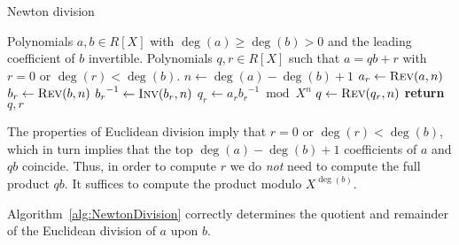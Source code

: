 \begin{algorithm}[H]
\caption{Newton division}
\label{alg:NewtonDivision}
\begin{algorithmic}
\vspace{1mm}
\Require Polynomials $a, b \in R[X]$ with $\deg(a) \geq \deg(b) > 0$ 
         and the leading coefficient of $b$ invertible.
\Ensure  Polynomials $q, r \in R[X]$ such that $a = qb + r$ with $r = 0$ 
         or $\deg(r) < \deg(b)$.
\State  $n \gets \deg(a) - \deg(b) + 1$
\State  $a_r \gets \Call{Rev}{a,n}$
\State  $b_r \gets \Call{Rev}{b,n}$
\State  ${b_r}^{-1} \gets \Call{Inv}{b_r,n}$
\State  $q_r \gets a_r {b_r}^{-1} \bmod X^n$
\State  $q \gets \Call{Rev}{q_r, n}$
\State \textbf{return} $q, r$
\EndProcedure
\end{algorithmic}
\end{algorithm}

\begin{rem}
The properties of Euclidean division imply that $r = 0$ or 
$\deg(r) < \deg(b)$, which in turn implies that the top 
$\deg(a) - \deg(b) + 1$ coefficients of $a$ and $q b$ 
coincide.  Thus, in order to compute $r$ we do \emph{not} 
need to compute the full product $q b$.  It suffices to 
compute the product modulo $X^{\deg(b)}$.
\end{rem}

\begin{thm}
Algorithm~\ref{alg:NewtonDivision} correctly determines 
the quotient and remainder of the Euclidean division of 
$a$ upon $b$.
\end{thm}


